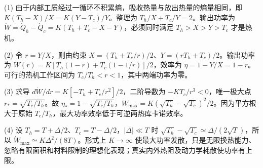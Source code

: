 (1) 由于内部工质经过一循环不积累熵，吸收热量与放出热量的熵量相同，即 \(K(T_h-X)/X=K(Y-T_c)/Y\)。整理为 \(T_h/X+T_c/Y=2\)。输出功率为 \(\dot W=\dot Q_h-\dot Q_c=K(T_h+T_c-X-Y)\)，必须同时满足 \(T_h>X>Y>T_c\) 才是热机。

(2) 令 \(r=Y/X\)，则由约束 \(X=(T_h+T_c/r)/2\)、\(Y=(rT_h+T_c)/2\)。输出功率为 \(\dot W(r)=K[T_h(1-r)+T_c(1-1/r)]/2\)，效率为 \(\eta=1-Y/X=1-r\)。可行的热机工作区间为 \(T_c/T_h<r<1\)，其中两端功率为零。

(3) 求导 \(d\dot W/dr=K[-T_h+T_c/r^2]/2\)，二阶导数为 \(-KT_c/r^3<0\)，唯一极大点 \(r_*=\sqrt{T_c/T_h}\)。故 \(\eta_*=1-\sqrt{T_c/T_h}\)，\(\dot W_{\max}=K(\sqrt{T_h}-\sqrt{T_c})^2/2\)。因为平方根大于原始 \(T_c/T_h\)，最大功率效率低于可逆两热库卡诺效率。

(4) 设 \(T_h=T+\Delta/2\)、\(T_c=T-\Delta/2\)，\(|\Delta|\ll T\) 时 \(\sqrt{T_h}-\sqrt{T_c}\simeq\Delta/(2\sqrt T)\)，所以 \(\dot W_{\max}\simeq K\Delta^2/(8T)\)。形式上 \(K\to\infty\) 使最大功率发散，只是无限换热能力、忽略有限面积和材料限制的理想化表现；真实内外热阻及动力学耗散使功率有上限。
